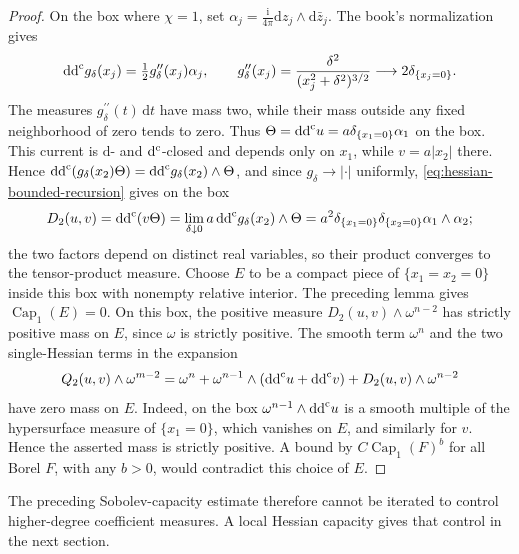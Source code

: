 \begin{proof}
On the box where $\chi=1$, set
$\alpha_j=\frac{\mathrm i}{4\pi}\mathrm dz_j\wedge\mathrm d\bar z_j$.
The book's normalization gives
\[
 \mathrm{dd}^{\mathrm{c}} g_\delta(x_j)=\tfrac12g_\delta''(x_j)\alpha_j,
 \qquad g_\delta''(x_j)
       =\frac{\delta^2}{(x_j^2+\delta^2)^{3/2}}
       \longrightarrow2\delta_{\{x_j=0\}}.
\]
The measures $g_\delta^{\prime\prime}(t)\,\mathrm dt$ have mass two,
while their mass outside any fixed neighborhood of zero tends to
zero. Thus $\Theta=\mathrm{dd}^{\mathrm{c}} u=a\delta_{\{x_1=0\}}\alpha_1$ on the box. This
current is $\mathrm d$- and $\mathrm d^{\mathrm c}$-closed and depends only on $x_1$,
while $v=a|x_2|$ there. Hence
$\mathrm{dd}^{\mathrm{c}}(g_\delta(x_2)\Theta)=\mathrm{dd}^{\mathrm{c}} g_\delta(x_2)\wedge\Theta$, and since
$g_\delta\to|\cdot|$ uniformly, \eqref{eq:hessian-bounded-recursion}
gives on the box
\[
 D_2(u,v)=\mathrm{dd}^{\mathrm{c}}(v\Theta)
 =\lim_{\delta\downarrow0}a\,\mathrm{dd}^{\mathrm{c}} g_\delta(x_2)\wedge\Theta
 =a^2\delta_{\{x_1=0\}}\delta_{\{x_2=0\}}
                         \alpha_1\wedge\alpha_2;
\]
the two factors depend on distinct real variables, so their product
converges to the tensor-product measure.
Choose $E$ to be a compact piece of $\{x_1=x_2=0\}$ inside this
box with nonempty relative interior. The preceding lemma gives
$\operatorname{Cap}_1(E)=0$. On this box, the positive measure
$D_2(u,v)\wedge\omega^{n-2}$ has strictly positive mass on $E$,
since $\omega$ is strictly positive. The smooth term $\omega^n$ and
the two single-Hessian terms in the expansion
\[
 Q_2(u,v)\wedge\omega^{m-2}
 =\omega^n+\omega^{n-1}\wedge(\mathrm{dd}^{\mathrm{c}} u+\mathrm{dd}^{\mathrm{c}} v)
                         +D_2(u,v)\wedge\omega^{n-2}
\]
have zero mass on $E$. Indeed, on the box $\omega^{n-1}\wedge\mathrm{dd}^{\mathrm{c}} u$
is a smooth multiple of the hypersurface measure of $\{x_1=0\}$,
which vanishes on $E$, and similarly for $v$. Hence the asserted
mass is strictly positive. A bound by
$C\operatorname{Cap}_1(F)^b$ for all Borel $F$, with any $b>0$,
would contradict this choice of $E$.
\end{proof}

The preceding Sobolev-capacity estimate therefore cannot be iterated
to control higher-degree coefficient measures. A local Hessian
capacity gives that control in the next section.
